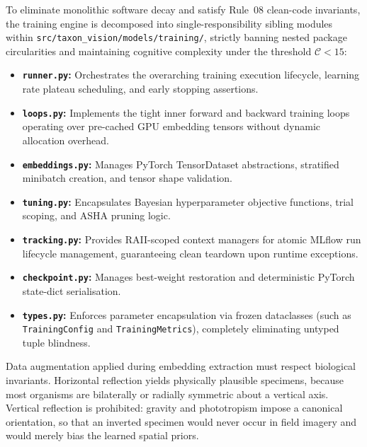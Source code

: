 To eliminate monolithic software decay and satisfy Rule~08 clean-code invariants, the training engine is decomposed into single-responsibility sibling modules within \nolinkurl{src/taxon_vision/models/training/}, strictly banning nested package circularities and maintaining cognitive complexity under the threshold $\mathcal{C} < 15$:
\begin{itemize}
    \item \textbf{\texttt{runner.py}:} Orchestrates the overarching training execution lifecycle, learning rate plateau scheduling, and early stopping assertions.
    \item \textbf{\texttt{loops.py}:} Implements the tight inner forward and backward training loops operating over pre-cached GPU embedding tensors without dynamic allocation overhead.
    \item \textbf{\texttt{embeddings.py}:} Manages PyTorch TensorDataset abstractions, stratified minibatch creation, and tensor shape validation.
    \item \textbf{\texttt{tuning.py}:} Encapsulates Bayesian hyperparameter objective functions, trial scoping, and ASHA pruning logic.
    \item \textbf{\texttt{tracking.py}:} Provides RAII-scoped context managers for atomic MLflow run lifecycle management, guaranteeing clean teardown upon runtime exceptions.
    \item \textbf{\texttt{checkpoint.py}:} Manages best-weight restoration and deterministic PyTorch state-dict serialisation.
    \item \textbf{\texttt{types.py}:} Enforces parameter encapsulation via frozen dataclasses (such as \texttt{TrainingConfig} and \texttt{TrainingMetrics}), completely eliminating untyped tuple blindness.
\end{itemize}

Data augmentation applied during embedding extraction must respect biological invariants. Horizontal reflection yields physically plausible specimens, because most organisms are bilaterally or radially symmetric about a vertical axis. Vertical reflection is prohibited: gravity and phototropism impose a canonical orientation, so that an inverted specimen would never occur in field imagery and would merely bias the learned spatial priors.
